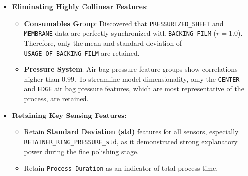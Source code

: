 \documentclass[11pt]{article}
\providecommand{\tightlist}{%
      \setlength{\itemsep}{0pt}\setlength{\parskip}{0pt}}
\begin{document}
\begin{itemize}
\tightlist
\item
  \textbf{Eliminating Highly Collinear Features}:

  \begin{itemize}
  \tightlist
  \item
    \textbf{Consumables Group}: Discovered that
    \texttt{PRESSURIZED\_SHEET} and \texttt{MEMBRANE} data are perfectly
    synchronized with \texttt{BACKING\_FILM} (\(r=1.0\)). Therefore,
    only the mean and standard deviation of
    \texttt{USAGE\_OF\_BACKING\_FILM} are retained.
  \item
    \textbf{Pressure System}: Air bag pressure feature groups show
    correlations higher than \(0.99\). To streamline model
    dimensionality, only the \texttt{CENTER} and \texttt{EDGE} air bag
    pressure features, which are most representative of the process, are
    retained.
  \end{itemize}
\item
  \textbf{Retaining Key Sensing Features}:

  \begin{itemize}
  \tightlist
  \item
    Retain \textbf{Standard Deviation (std)} features for all sensors,
    especially \texttt{RETAINER\_RING\_PRESSURE\_std}, as it
    demonstrated strong explanatory power during the fine polishing
    stage.
  \item
    Retain \texttt{Process\_Duration} as an indicator of total process
    time.
  \end{itemize}
\end{itemize}
\end{document}

